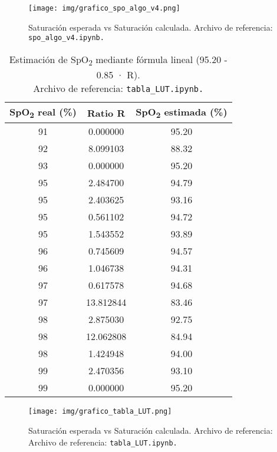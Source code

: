 \begin{figure}[H]
    \centering
    \texttt{[image: img/grafico\_spo\_algo\_v4.png]}
    \caption{Saturación esperada vs Saturación calculada. Archivo de referencia: \texttt{spo\_algo\_v4.ipynb.}}
    \label{fig:grafico_spo_algo_v4}
\end{figure}


\begin{table}[H]
\centering
\begin{tabular}{|c|c|c|}
\hline
\textbf{SpO\textsubscript{2} real (\%)} & \textbf{Ratio R} & \textbf{SpO\textsubscript{2} estimada (\%)} \\
\hline
91 & 0.000000 & 95.20 \\
\hline
92 & 8.099103 & 88.32 \\
\hline
93 & 0.000000 & 95.20 \\
\hline
95 & 2.484700 & 94.79 \\
\hline
95 & 2.403625 & 93.16 \\
\hline
95 & 0.561102 & 94.72 \\
\hline
95 & 1.543552 & 93.89 \\
\hline
96 & 0.745609 & 94.57 \\
\hline
96 & 1.046738 & 94.31 \\
\hline
97 & 0.617578 & 94.68 \\
\hline
97 & 13.812844 & 83.46 \\
\hline
98 & 2.875030 & 92.75 \\
\hline
98 & 12.062808 & 84.94 \\
\hline
98 & 1.424948 & 94.00 \\
\hline
99 & 2.470356 & 93.10 \\
\hline
99 & 0.000000 & 95.20 \\
\hline
\end{tabular}
\caption{Estimación de SpO\textsubscript{2} mediante fórmula lineal (95.20 - 0.85 · R).\\
Archivo de referencia: \texttt{tabla\_LUT.ipynb.}}

\label{tabla:spo2_formula_lineal}
\end{table}

\begin{figure}[H]
    \centering
    \texttt{[image: img/grafico\_tabla\_LUT.png]}
    \caption{Saturación esperada vs Saturación calculada. Archivo de referencia: Archivo de referencia: \texttt{tabla\_LUT.ipynb.}}
    \label{fig:grafico_spo2_lut}
\end{figure}


